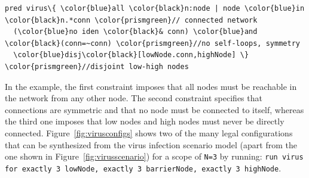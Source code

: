 \documentclass[10pt,journal,compsoc]{IEEEtran}
\begin{document}
\smallskip
{\scriptsize
\begin{Verbatim}[commandchars=\\\{\},codes={\catcode`$=3\catcode`^=7\catcode`_=8}]
pred virus\{ \color{blue}all \color{black}n:node | node \color{blue}in \color{black}n.*conn \color{prismgreen}// connected network
  (\color{blue}no iden \color{black}& conn) \color{blue}and \color{black}(conn=~conn) \color{prismgreen}//no self-loops, symmetry
  \color{blue}disj\color{black}[lowNode.conn,highNode] \} \color{prismgreen}//disjoint low-high nodes
\end{Verbatim}
}

In the example, the first constraint imposes that all nodes must be reachable in the network from any other node. 
The second constraint specifies that connections are symmetric and that no node must be connected to itself, whereas the third one imposes that low nodes and high nodes must never be directly connected. 
Figure~\ref{fig:virusconfigs} shows two of the many legal configurations that can be synthesized from the virus infection scenario model (apart from the one shown in Figure~\ref{fig:virusscenario}) for a scope of {\tt N=3} by running: {\footnotesize \tt \color{blue}run \color{black}virus \color{blue}for exactly \color{black}3 lowNode, \color{blue}exactly \color{black}3 barrierNode, \color{blue}exactly \color{black}3 highNode}.


\end{document}
